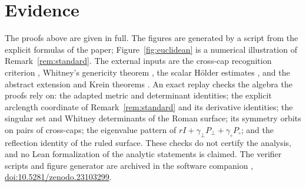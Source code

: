 \documentclass[11pt]{article}
\theoremstyle{definition}\newtheorem{definition}[theorem]{Definition}
\theoremstyle{remark}\newtheorem{remark}[theorem]{Remark}
\begin{document}
\appendix
\section{Evidence}\label{app:evidence}
The proofs above are given in full. The figures are generated by a script
from the explicit formulas of the paper; Figure~\ref{fig:euclidean} is a
numerical illustration of Remark~\ref{rem:standard}. The external inputs are the cross-cap
recognition criterion \cite{hasegawa}, Whitney's genericity theorem
\cite{whitney44,gg}, the scalar H\"older estimates \cite{gt,simon}, and the
abstract extension and Krein theorems \cite{pos,krein}. An exact replay checks
the algebra the proofs rely on: the adapted metric and determinant identities;
the explicit arclength coordinate of Remark~\ref{rem:standard} and its
derivative identities; the singular
set and Whitney determinants of the Roman surface; its symmetry orbits on pairs
of cross-caps; the eigenvalue pattern of $rI+\gamma_\perp P_\perp+\gamma_\circ P_\circ$;
and the reflection identity of the ruled surface. These checks do not certify
the analysis, and no Lean formalization of the analytic statements is claimed.
The verifier scripts and figure generator are archived in the software companion
\cite{software}, \href{https://doi.org/10.5281/zenodo.23103299}{doi:10.5281/zenodo.23103299}.
\end{document}
